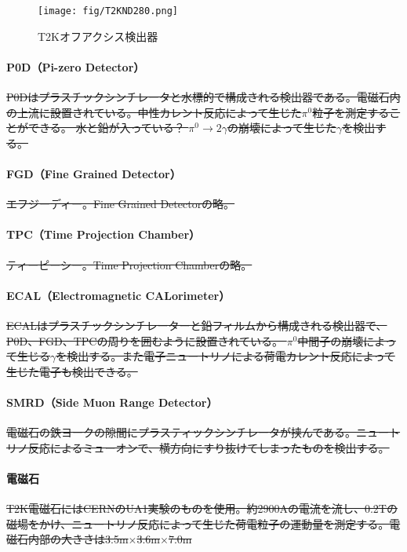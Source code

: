 \documentclass[11pt]{jreport}
\begin{document}
\begin{figure}[htbp]
\centering
\texttt{[image: fig/T2KND280.png]}
\caption[T2Kオフアクシス検出器]{T2Kオフアクシス検出器}
\label{TOAD}
\end{figure}

\paragraph{P0D（Pi-zero Detector）}
\sout{P0Dはプラスチックシンチレータと水標的で構成される検出器である。電磁石内の上流に設置されている。中性カレント反応によって生じた$\pi^{0}$粒子を測定することができる。
水と鉛が入っている？
%
$\pi^{0} \rightarrow 2 \gamma$の崩壊によって生じた$\gamma$を検出する。}

\paragraph{FGD（Fine Grained Detector）}
\sout{エフジーディー。Fine Grained Detectorの略。}

\paragraph{TPC（Time Projection Chamber）}
\sout{ティーピーシー。Time Projection Chamberの略。}

\paragraph{ECAL（Electromagnetic CALorimeter）}
\sout{ECALはプラスチックシンチレーターと鉛フィルムから構成される検出器で、P0D、FGD、TPCの周りを囲むように設置されている。
$\pi^{0}$中間子の崩壊によって生じる$\gamma$を検出する。また電子ニュートリノによる荷電カレント反応によって生じた電子も検出できる。}

\paragraph{SMRD（Side Muon Range Detector）}
\sout{電磁石の鉄ヨークの隙間にプラスティックシンチレータが挟んである。ニュートリノ反応によるミューオンで、横方向にすり抜けてしまったものを検出する。}

\paragraph{電磁石}
\sout{T2K電磁石にはCERNのUA1実験のものを使用。約2900Aの電流を流し、0.2Tの磁場をかけ、ニュートリノ反応によって生じた荷電粒子の運動量を測定する。電磁石内部の大きさは3.5m$\times$3.6m$\times$7.0m}
\end{document}

